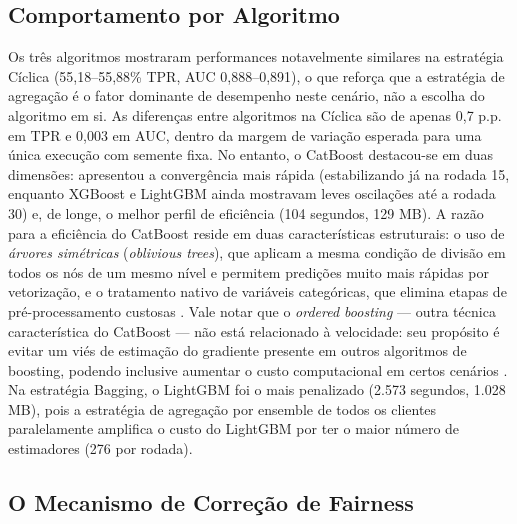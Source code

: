 \subsection{Comportamento por Algoritmo}

Os três algoritmos mostraram performances notavelmente similares na estratégia Cíclica (55,18--55,88\% TPR, AUC 0,888--0,891), o que reforça que a estratégia de agregação é o fator dominante de desempenho neste cenário, não a escolha do algoritmo em si. As diferenças entre algoritmos na Cíclica são de apenas 0,7 p.p. em TPR e 0,003 em AUC, dentro da margem de variação esperada para uma única execução com semente fixa. No entanto, o CatBoost destacou-se em duas dimensões: apresentou a convergência mais rápida (estabilizando já na rodada 15, enquanto XGBoost e LightGBM ainda mostravam leves oscilações até a rodada 30) e, de longe, o melhor perfil de eficiência (104 segundos, 129 MB). A razão para a eficiência do CatBoost reside em duas características estruturais: o uso de \textit{árvores simétricas} (\textit{oblivious trees}), que aplicam a mesma condição de divisão em todos os nós de um mesmo nível e permitem predições muito mais rápidas por vetorização, e o tratamento nativo de variáveis categóricas, que elimina etapas de pré-processamento custosas \cite{prokhorenkova2018catboost}. Vale notar que o \textit{ordered boosting} --- outra técnica característica do CatBoost --- não está relacionado à velocidade: seu propósito é evitar um viés de estimação do gradiente presente em outros algoritmos de boosting, podendo inclusive aumentar o custo computacional em certos cenários \cite{prokhorenkova2018catboost}. Na estratégia Bagging, o LightGBM foi o mais penalizado (2.573 segundos, 1.028 MB), pois a estratégia de agregação por ensemble de todos os clientes paralelamente amplifica o custo do LightGBM por ter o maior número de estimadores (276 por rodada).

\subsection{O Mecanismo de Correção de Fairness}

